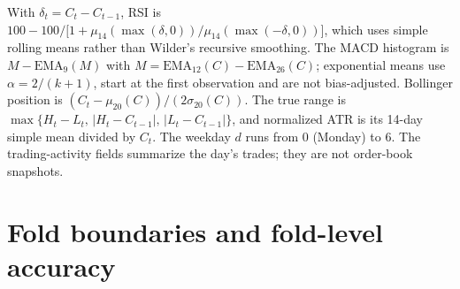 \documentclass[preprint,12pt,authoryear,a4paper]{elsarticle}
\begin{document}
With $\delta_t=C_t-C_{t-1}$, RSI is
$100-100/\bigl[1+\mu_{14}(\max(\delta,0))/\mu_{14}(\max(-\delta,0))\bigr]$, which
uses simple rolling means rather than Wilder's recursive smoothing. The MACD
histogram is $M-\mathrm{EMA}_9(M)$ with $M=\mathrm{EMA}_{12}(C)-\mathrm{EMA}_{26}(C)$;
exponential means use $\alpha=2/(k+1)$, start at the first observation and are not
bias-adjusted. Bollinger position is $(C_t-\mu_{20}(C))/(2\sigma_{20}(C))$. The
true range is $\max\{H_t-L_t,\,|H_t-C_{t-1}|,\,|L_t-C_{t-1}|\}$, and normalized ATR
is its 14-day simple mean divided by $C_t$. The weekday $d$ runs from 0 (Monday) to
6. The trading-activity fields summarize the day's trades; they are not order-book
snapshots.

\section{Fold boundaries and fold-level accuracy}\label{app:folds}
\end{document}
